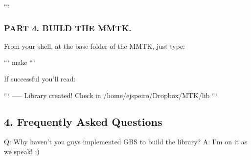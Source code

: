 \begin{DoxyPre}
```\end{DoxyPre}



\begin{DoxyPre}\subsubsection*{PART 4. BUILD THE MMTK.}\end{DoxyPre}



\begin{DoxyPre}\end{DoxyPre}



\begin{DoxyPre}From your shell, at the base folder of the MMTK, just type:\end{DoxyPre}



\begin{DoxyPre}```
make
```\end{DoxyPre}



\begin{DoxyPre}If successful you'll read:\end{DoxyPre}



\begin{DoxyPre}```
----- Library created! Check in /home/ejspeiro/Dropbox/MTK/lib
```


\end{DoxyPre}



\begin{DoxyPre}\subsection*{4. Frequently Asked Questions}\end{DoxyPre}



\begin{DoxyPre}\end{DoxyPre}



\begin{DoxyPre}Q: Why haven't you guys implemented GBS to build the library?
A: I'm on it as we speak! ;)\end{DoxyPre}



